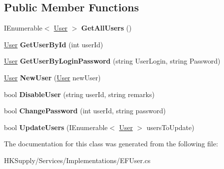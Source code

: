 \subsection*{Public Member Functions}
\begin{DoxyCompactItemize}
\item 
\mbox{\label{class_h_k_supply_1_1_services_1_1_implementations_1_1_e_f_user_a145638eeeb9e29780d17cbac23476a8d}} 
I\+Enumerable$<$ \hyperlink{class_h_k_supply_1_1_models_1_1_user}{User} $>$ {\bfseries Get\+All\+Users} ()
\item 
\mbox{\label{class_h_k_supply_1_1_services_1_1_implementations_1_1_e_f_user_a322969baaacbf15223b17f8117dd1545}} 
\hyperlink{class_h_k_supply_1_1_models_1_1_user}{User} {\bfseries Get\+User\+By\+Id} (int user\+Id)
\item 
\mbox{\label{class_h_k_supply_1_1_services_1_1_implementations_1_1_e_f_user_a69f04e0ab5ba947fc315c60abc7cdbf1}} 
\hyperlink{class_h_k_supply_1_1_models_1_1_user}{User} {\bfseries Get\+User\+By\+Login\+Password} (string User\+Login, string Password)
\item 
\mbox{\label{class_h_k_supply_1_1_services_1_1_implementations_1_1_e_f_user_a12abd287dc0491eed772d88b17fc9618}} 
\hyperlink{class_h_k_supply_1_1_models_1_1_user}{User} {\bfseries New\+User} (\hyperlink{class_h_k_supply_1_1_models_1_1_user}{User} new\+User)
\item 
\mbox{\label{class_h_k_supply_1_1_services_1_1_implementations_1_1_e_f_user_acb2996bf9f333684786d3e2d7b702ba4}} 
bool {\bfseries Disable\+User} (string user\+Id, string remarks)
\item 
\mbox{\label{class_h_k_supply_1_1_services_1_1_implementations_1_1_e_f_user_ada8f9352d6fed7594d449aed92f452a0}} 
bool {\bfseries Change\+Password} (int user\+Id, string password)
\item 
\mbox{\label{class_h_k_supply_1_1_services_1_1_implementations_1_1_e_f_user_af7bbea584cce6ec7e2b8f4b4d46c01f6}} 
bool {\bfseries Update\+Users} (I\+Enumerable$<$ \hyperlink{class_h_k_supply_1_1_models_1_1_user}{User} $>$ users\+To\+Update)
\end{DoxyCompactItemize}


The documentation for this class was generated from the following file\+:\begin{DoxyCompactItemize}
\item 
H\+K\+Supply/\+Services/\+Implementations/E\+F\+User.\+cs\end{DoxyCompactItemize}
